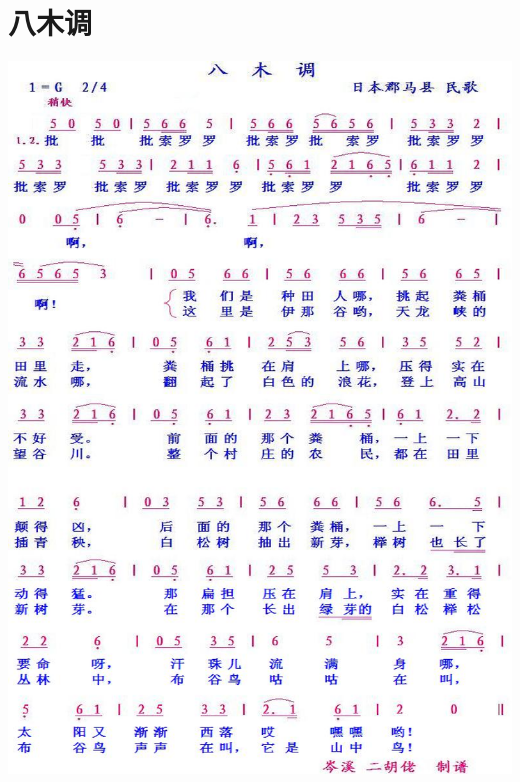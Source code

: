 \documentclass[cn,pad,chinese,chinesefont=nofont]{elegantbook}
\begin{document}
\section{八木调}
\includegraphics[height=\textheight]{dongxiao/日本-八木调.jpg}
\end{document}
